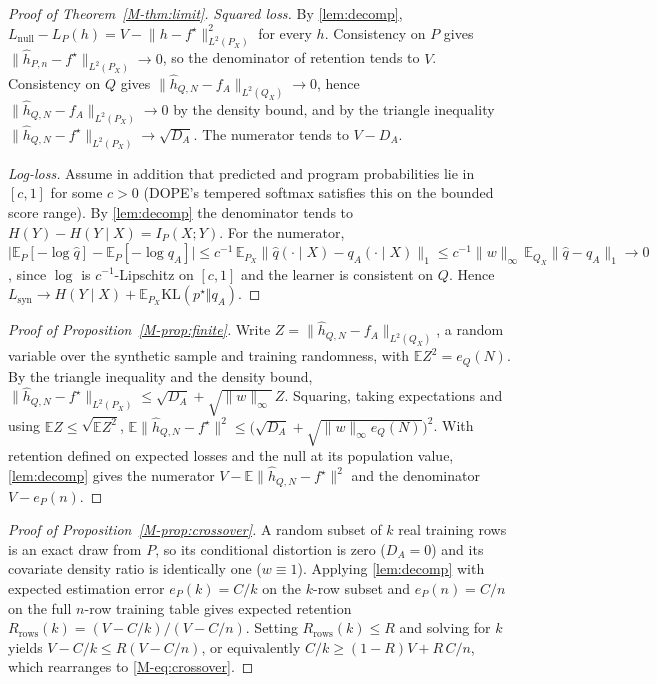 \documentclass[10pt,letterpaper]{article}
\begin{document}
\begin{proof}[Proof of Theorem~\ref{M-thm:limit}]
\emph{Squared loss.} By \cref{lem:decomp}, $L_{\mathrm{null}}-L_P(h)=V-\lVert h-f^\star\rVert^2_{L^2(P_X)}$ for
every $h$. Consistency on $P$ gives $\lVert\hat h_{P,n}-f^\star\rVert_{L^2(P_X)}\to 0$, so the denominator of
retention tends to $V$. Consistency on $Q$ gives $\lVert\hat h_{Q,N}-f_A\rVert_{L^2(Q_X)}\to0$, hence
$\lVert\hat h_{Q,N}-f_A\rVert_{L^2(P_X)}\to0$ by the density bound, and by the triangle inequality
$\lVert\hat h_{Q,N}-f^\star\rVert_{L^2(P_X)}\to\sqrt{D_A}$. The numerator tends to $V-D_A$.

\emph{Log-loss.} Assume in addition that predicted and program probabilities lie in $[c,1]$ for some
$c>0$ (DOPE's tempered softmax satisfies this on the bounded score range). By \cref{lem:decomp} the
denominator tends to $H(Y)-H(Y\mid X)=I_P(X;Y)$. For the numerator,
$\bigl|\mathbb{E}_P[-\log\hat q]-\mathbb{E}_P[-\log q_A]\bigr|\le c^{-1}\,\mathbb{E}_{P_X}\lVert\hat q(\cdot\mid X)-q_A(\cdot\mid X)\rVert_1
\le c^{-1}\lVert w\rVert_\infty\,\mathbb{E}_{Q_X}\lVert\hat q-q_A\rVert_1\to0$, since $\log$ is $c^{-1}$-Lipschitz on
$[c,1]$ and the learner is consistent on $Q$. Hence $L_{\mathrm{syn}}\to H(Y\mid X)+\mathbb{E}_{P_X}\mathrm{KL}(p^\star\Vert q_A)$.
\end{proof}

\begin{proof}[Proof of Proposition~\ref{M-prop:finite}]
Write $Z=\lVert\hat h_{Q,N}-f_A\rVert_{L^2(Q_X)}$, a random variable over the synthetic sample and training
randomness, with $\mathbb{E}Z^2=e_Q(N)$. By the triangle inequality and the density bound,
$\lVert\hat h_{Q,N}-f^\star\rVert_{L^2(P_X)}\le\sqrt{D_A}+\sqrt{\lVert w\rVert_\infty}\,Z$. Squaring, taking
expectations and using $\mathbb{E}Z\le\sqrt{\mathbb{E}Z^2}$,
$\mathbb{E}\lVert\hat h_{Q,N}-f^\star\rVert^2\le\bigl(\sqrt{D_A}+\sqrt{\lVert w\rVert_\infty e_Q(N)}\bigr)^2$. With
retention defined on expected losses and the null at its population value, \cref{lem:decomp} gives the
numerator $V-\mathbb{E}\lVert\hat h_{Q,N}-f^\star\rVert^2$ and the denominator $V-e_P(n)$.
\end{proof}

\begin{proof}[Proof of Proposition~\ref{M-prop:crossover}]
A random subset of $k$ real training rows is an exact draw from $P$, so its conditional distortion is
zero ($D_A=0$) and its covariate density ratio is identically one ($w\equiv 1$). Applying
\cref{lem:decomp} with expected estimation error $e_P(k)=C/k$ on the $k$-row subset and $e_P(n)=C/n$ on
the full $n$-row training table gives expected retention
$R_{\mathrm{rows}}(k)=(V-C/k)/(V-C/n)$. Setting $R_{\mathrm{rows}}(k)\le R$ and solving for $k$ yields
$V-C/k\le R(V-C/n)$, or equivalently $C/k\ge (1-R)V + R\,C/n$, which rearranges to
\eqref{M-eq:crossover}.
\end{proof}
\end{document}
